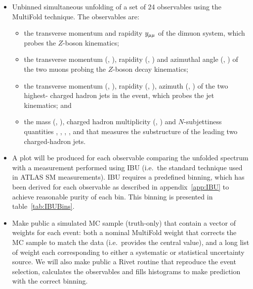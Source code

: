 \begin{itemize}
\item
  Unbinned simultaneous unfolding of a set of 24 observables using the MultiFold technique.
  The observables are:
  \begin{itemize}
    \item
      the transverse momentum \ptll{} and rapidity $y_{\mu\mu}$ of the dimuon system, which probes the $Z$-boson kinematics;
    \item
      the transverse momentum (\ptlm, \ptsm),
      rapidity (\ylm{}, \ysm) and azimuthal angle (\philm, \phism) of the two muons probing the $Z$-boson decay kinematics;
    \item
      the transverse momentum (\ptlj, \ptsj), rapidity (\ylj{}, \ysj), azimuth (\philj, \phisj) of the two highest-\pt{} charged hadron jets in the event, which probes the jet kinematics; and
    \item
      the mass (\mlj, \msj), charged hadron multiplicity (\Nclj, \Ncsj) and $N$-subjettiness quantities , %
      , , ,  and  that measures the substructure of the leading two charged-hadron jets. 
  \end{itemize}  
\item
   A plot will be produced for each observable comparing the unfolded spectrum with a measurement performed using IBU (i.e.\ the standard technique used in ATLAS SM measurements).
   IBU requires a predefined binning, which has been derived for each observable as described in appendix~\ref{app:IBU} to achieve reasonable purity of each bin. 
   This binning is presented in table~\ref{tab:IBUBins}.
\item
  Make public a simulated MC sample (truth-only) that contain a vector of weights for each event: both a nominal MultiFold weight that corrects the MC sample to match the data (i.e.\ provides the central value), and a long list of weight each corresponding to either a systematic or statistical uncertainty source. We will also make public a Rivet routine that reproduce the event selection, calculates the observables and fills histograms to make prediction with the correct binning.
\end{itemize}

